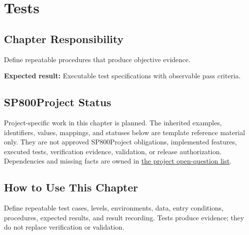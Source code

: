 \chapter{Tests}
\section{Chapter Responsibility}
\label{Section:TestsResponsibility}
Define repeatable procedures that produce objective evidence.

\noindent\textbf{Expected result:} Executable test specifications with observable pass criteria.

\section{SP800Project Status}
\label{Section:SP800StatusTests}
Project-specific work in this chapter is planned. The inherited examples,
identifiers, values, mappings, and statuses below are template reference
material only. They are not approved SP800Project obligations, implemented features,
executed tests, verification evidence, validation, or release authorization.
Dependencies and missing facts are owned in
\hyperref[Section:SP800OpenQuestions]{the project open-question list}.

\section{How to Use This Chapter}
Define repeatable test cases, levels, environments, data, entry conditions, procedures, expected results, and result recording. Tests produce evidence; they do not replace verification or validation.
